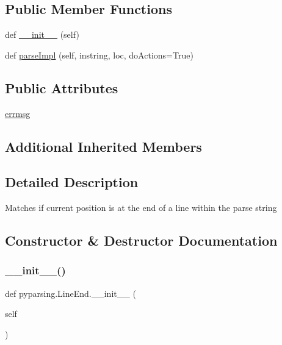 \subsection*{Public Member Functions}
\begin{DoxyCompactItemize}
\item 
def \hyperlink{classpyparsing_1_1LineEnd_acaee36a914330b5bd025d0c5d0c284b1}{\+\_\+\+\_\+init\+\_\+\+\_\+} (self)
\item 
def \hyperlink{classpyparsing_1_1LineEnd_a8f8c4067e2cc0894cc145ebb169243ed}{parse\+Impl} (self, instring, loc, do\+Actions=True)
\end{DoxyCompactItemize}
\subsection*{Public Attributes}
\begin{DoxyCompactItemize}
\item 
\hyperlink{classpyparsing_1_1LineEnd_ab28bc90ed0d3c8fe64525f3ad88d995c}{errmsg}
\end{DoxyCompactItemize}
\subsection*{Additional Inherited Members}


\subsection{Detailed Description}
\begin{DoxyVerb}Matches if current position is at the end of a line within the
parse string
\end{DoxyVerb}
 

\subsection{Constructor \& Destructor Documentation}
\mbox{\label{classpyparsing_1_1LineEnd_acaee36a914330b5bd025d0c5d0c284b1}} 
\subsubsection{\texorpdfstring{\+\_\+\+\_\+init\+\_\+\+\_\+()}{\_\_init\_\_()}}
{\footnotesize\ttfamily def pyparsing.\+Line\+End.\+\_\+\+\_\+init\+\_\+\+\_\+ (\begin{DoxyParamCaption}\item[{}]{self }\end{DoxyParamCaption})}



